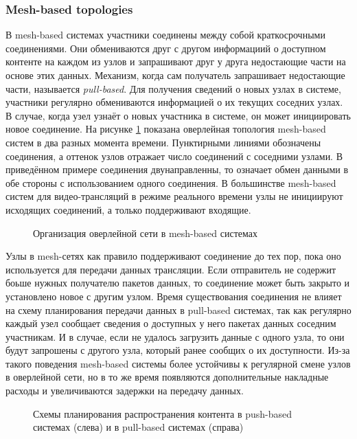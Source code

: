 		\subsubsection{Mesh-based topologies}
		В mesh-based системах участники соединены между собой краткосрочными соединениями. Они обмениваются друг с
		другом информациий о доступном контенте на каждом из узлов и запрашивают друг у друга недостающие части на
		основе этих данных. Механизм, когда сам получатель запрашивает недостающие части, называется \textit{pull-based}.
		Для получения сведений о новых узлах в системе, участники регулярно обмениваются информацией о их текущих
		соседних узлах. В случае, когда узел узнаёт о новых участника в системе, он может инициировать новое соединение.
		На рисунке \ref{img:mesh-based-system} показана оверлейная топология mesh-based систем в два разных момента
		времени. Пунктирными линиями обозначены соединения, а оттенок узлов отражает число соединений с соседними узлами.
		В приведённом примере соединения двунаправленны, то означает обмен данными в обе стороны с использованием одного
		соединения. В большинстве mesh-based систем для видео-трансляций в режиме реального времени узлы не инициируют
		исходящих соединений, а только поддерживают входящие.

		\begin{figure}[h]
			\caption{Организация оверлейной сети в mesh-based системах}
			\label{img:mesh-based-system}
		\end{figure}

		Узлы в mesh-сетях как правило поддерживают соединение до тех пор, пока оно используется для передачи данных
		трансляции. Если отправитель не содержит боьше нужных получателю пакетов данных, то соединение может быть
		закрыто и установлено новое с другим узлом. Время существования соединения не влияет на схему планирования
		передачи данных в pull-based системах, так как регулярно каждый узел сообщает сведения о доступных у него
		пакетах данных соседним участникам. И в случае, если не удалось загрузить данные с одного узла, то они
		будут запрошены с другого узла, который ранее сообщих о их доступности. Из-за такого поведения mesh-based
		системы более устойчивы к регулярной смене узлов в оверлейной сети, но в то же время появляются дополнительные
		накладные расходы и увеличиваются задержки на передачу данных.

		\begin{figure}[h]
			\caption{Схемы планирования распространения контента в push-based системах (слева) и в pull-based системах
					(справа)}
			\label{img:scheduling-scheme}
		\end{figure}


